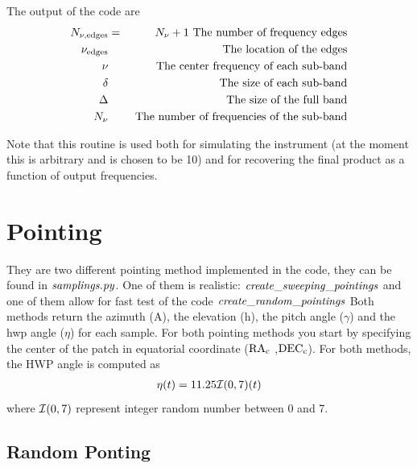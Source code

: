 \documentclass[a4paper, 11pt]{article}
\def\ba{\begin{eqnarray}}
\def\ea{\end{eqnarray}}
\begin{document}
The output of the code are
\ba
N_{\nu, {\rm edges}} &=& N_{\nu}+1  \text{ The  number of frequency edges} \\
\nu_{\rm edges} && \text{ The  location of the edges} \\
\nu  && \text{ The center frequency of each sub-band} \\
\delta  && \text{ The size of each sub-band} \\
\Delta  && \text{ The size of the full band} \\
N_{\nu}  && \text{ The number of frequencies of the sub-band}
\ea

Note that this routine is used both for simulating the instrument (at the moment this is arbitrary and is chosen to be 10) and for recovering the final product as a function of output frequencies.




\section{Pointing}

They are two different pointing method implemented in the code, they can be found in $\it{samplings.py}$. One of them is realistic: $\it{create\_sweeping\_pointings}$ and one of them allow for fast test of the code $\it{create\_random\_pointings}$
Both methods return the azimuth (A), the elevation (h), the pitch angle ($\gamma$) and the hwp angle  ($\eta$)  for each sample.
For both pointing methods you start by specifying the center of the patch in equatorial coordinate (${\rm{RA_c}}$ ,${\rm{DEC_c}}$).
For both methods, the HWP angle is computed as
\ba
\eta(t)=11.25 {\cal I}(0,7)(t)
\ea
where ${\cal I}(0,7)$ represent integer random number between 0 and 7.

\subsection{Random Ponting}
\end{document}
